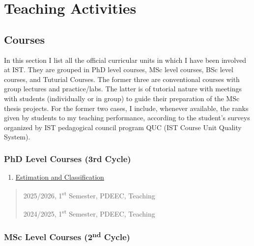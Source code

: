 \section{Teaching Activities}\label{teaching-activities}

\subsection{Courses}\label{courses-1}

In this section I list all the official curricular units in which I have
been involved at IST. They are grouped in PhD level courses, MSc level
courses, BSc level courses, and Tuturial Courses. The former three are
conventional courses with group lectures and practice/labs. The latter
is of tutorial nature with meetings with students (individually or in
group) to guide their preparation of the MSc thesis projects. For the
former two cases, I include, whenever available, the ranks given by
students to my teaching performance, according to the student's surveys
organized by IST pedagogical council program QUC (IST Course Unit
Quality System).

\subsubsection{PhD Level Courses (3rd
Cycle)}\label{phd-level-courses-3rd-cycle}

\begin{enumerate}
\def\labelenumi{\arabic{enumi}.}
\item
  \ul{Estimation and Classification}
\end{enumerate}
\begin{quote}
2025/2026, 1\textsuperscript{st} Semester, PDEEC, Teaching

2024/2025, 1\textsuperscript{st} Semester, PDEEC, Teaching
\end{quote}

\subsubsection{\texorpdfstring{MSc Level Courses (2\textsuperscript{nd}
Cycle)}{MSc Level Courses (2nd Cycle)}}\label{msc-level-courses-2nd-cycle}


